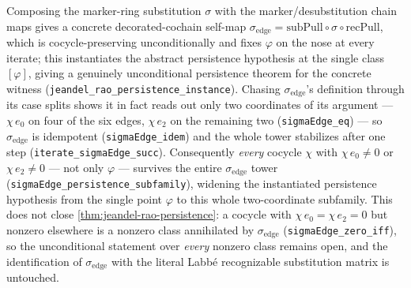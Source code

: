 \begin{theorem}
  \label{thm:jeandel-rao-persistence-instance}
  \leanok
  Composing the marker-ring substitution $\sigma$ with the marker/desubstitution
  chain maps gives a concrete decorated-cochain self-map
  $\sigma_{\mathrm{edge}}=\mathrm{subPull}\circ\sigma\circ\mathrm{recPull}$, which is
  cocycle-preserving unconditionally and fixes $\varphi$ on the nose at every
  iterate; this instantiates the abstract persistence hypothesis at the single
  class $[\varphi]$, giving a genuinely unconditional persistence theorem for the
  concrete witness (\texttt{jeandel\_rao\_persistence\_instance}). Chasing
  $\sigma_{\mathrm{edge}}$'s definition through its case splits shows it in fact
  reads out only two coordinates of its argument --- $\chi\,e_0$ on four of the six
  edges, $\chi\,e_2$ on the remaining two (\texttt{sigmaEdge\_eq}) --- so
  $\sigma_{\mathrm{edge}}$ is idempotent (\texttt{sigmaEdge\_idem}) and the whole
  tower stabilizes after one step (\texttt{iterate\_sigmaEdge\_succ}). Consequently
  \emph{every} cocycle $\chi$ with $\chi\,e_0\ne0$ or $\chi\,e_2\ne0$ --- not only
  $\varphi$ --- survives the entire $\sigma_{\mathrm{edge}}$ tower
  (\texttt{sigmaEdge\_persistence\_subfamily}), widening the instantiated
  persistence hypothesis from the single point $\varphi$ to this whole
  two-coordinate subfamily. This does not close
  \cref{thm:jeandel-rao-persistence}: a cocycle with $\chi\,e_0=\chi\,e_2=0$ but
  nonzero elsewhere is a nonzero class annihilated by $\sigma_{\mathrm{edge}}$
  (\texttt{sigmaEdge\_zero\_iff}), so the unconditional statement over
  \emph{every} nonzero class remains open, and the identification of
  $\sigma_{\mathrm{edge}}$ with the literal Labb\'e recognizable substitution
  matrix is untouched.
\end{theorem}

